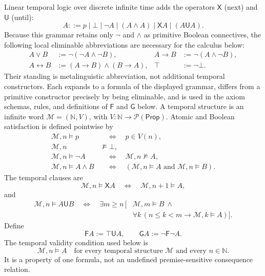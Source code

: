 \documentclass[11pt,oneside,openany]{book}
\theoremstyle{definition}
\theoremstyle{plain}
\theoremstyle{remark}
\newcommand{\N}{\mathbb{N}}
\newcommand{\Pow}{\mathcal{P}}
\newcommand{\Prop}{\mathsf{Prop}}
\newcommand{\entails}{\models}
\newcommand{\notentails}{\not\models}
\newcommand{\bottom}{\bot}
\newcommand{\topv}{\top}
\newcommand{\defeq}{\mathrel{:=}}
\begin{document}
Linear temporal logic over discrete infinite time adds the operators
\(\mathsf X\) (next) and \(\mathbin{\mathsf U}\) (until):
\[
  A::=p\mid\bottom\mid\neg A\mid(A\land A)\mid\mathsf X A\mid
       (A\mathbin{\mathsf U}A).
\]
Because this grammar retains only \(\neg\) and \(\land\) as primitive Boolean
connectives, the following local eliminable abbreviations are necessary for the
calculus below:
\[
\begin{aligned}
  A\lor B&\defeq\neg(\neg A\land\neg B),
  & A\to B&\defeq\neg(A\land\neg B),\\
  A\leftrightarrow B&\defeq(A\to B)\land(B\to A),
  & \topv&\defeq\neg\bottom.
\end{aligned}
\]
Their standing is metalinguistic abbreviation, not additional temporal
constructors.  Each expands to a formula of the displayed grammar, differs
from a primitive constructor precisely by being eliminable, and is used in the
axiom schemas, rules, and definitions of \(\mathsf F\) and \(\mathsf G\) below.
A temporal structure is an infinite word
\(\mathcal M=(\N,V)\), with
\(V:\N\to\Pow(\Prop)\).  Atomic and Boolean satisfaction is defined
pointwise by
\[
\begin{aligned}
  \mathcal M,n\entails p
    &\quad\Longleftrightarrow\quad p\in V(n),\\
  \mathcal M,n&\notentails\bottom,\\
  \mathcal M,n\entails\neg A
    &\quad\Longleftrightarrow\quad\mathcal M,n\notentails A,\\
  \mathcal M,n\entails A\land B
    &\quad\Longleftrightarrow\quad
      (\mathcal M,n\entails A\text{ and }\mathcal M,n\entails B).
\end{aligned}
\]
The temporal clauses are
\[
  \mathcal M,n\entails\mathsf X A
  \quad\Longleftrightarrow\quad
  \mathcal M,n+1\entails A,
\]
and
\[
\begin{aligned}
  \mathcal M,n\entails A\mathbin{\mathsf U}B
  \quad\Longleftrightarrow\quad
  \exists m\geq n\,[&\mathcal M,m\entails B\ \land{}\\
   &\forall k\,(n\leq k<m\to\mathcal M,k\entails A)].
\end{aligned}
\]
Define
\[
  \mathsf F A\defeq\topv\mathbin{\mathsf U}A,
  \qquad
  \mathsf G A\defeq\neg\mathsf F\neg A.
\]
The temporal validity condition used below is
\[
  \mathcal M,n\entails A
  \quad\text{for every temporal structure \(\mathcal M\) and every
  \(n\in\N\)}.
\]
It is a property of one formula, not an undefined premise-sensitive consequence
relation.
\end{document}
